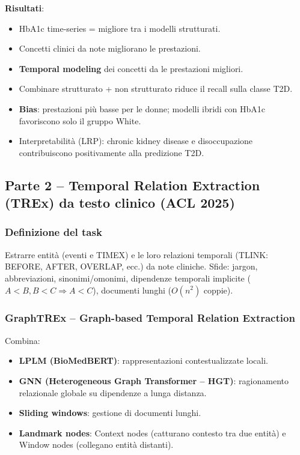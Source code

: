 \documentclass[a4paper,12pt]{article}
\begin{document}
\textbf{Risultati}:
\begin{itemize}
    \item HbA1c time-series = migliore tra i modelli strutturati.
    \item Concetti clinici da note migliorano le prestazioni.
    \item \textbf{Temporal modeling} dei concetti da le prestazioni migliori.
    \item Combinare strutturato + non strutturato riduce il recall sulla classe T2D.
    \item \textbf{Bias}: prestazioni pi\`u basse per le donne; modelli ibridi con HbA1c favoriscono solo il gruppo White.
    \item Interpretabilit\`a (LRP): chronic kidney disease e disoccupazione contribuiscono positivamente alla predizione T2D.
\end{itemize}

\subsection{Parte 2 -- Temporal Relation Extraction (TREx) da testo clinico (ACL 2025)}

\subsubsection{Definizione del task}
Estrarre entit\`a (eventi e TIMEX) e le loro relazioni temporali (TLINK: BEFORE, AFTER, OVERLAP, ecc.) da note cliniche. Sfide: jargon, abbreviazioni, sinonimi/omonimi, dipendenze temporali implicite ($A < B, B < C \Rightarrow A < C$), documenti lunghi ($O(n^2)$ coppie).

\subsubsection{GraphTREx -- Graph-based Temporal Relation Extraction}
Combina:
\begin{itemize}
    \item \textbf{LPLM (BioMedBERT)}: rappresentazioni contestualizzate locali.
    \item \textbf{GNN (Heterogeneous Graph Transformer -- HGT)}: ragionamento relazionale globale su dipendenze a lunga distanza.
    \item \textbf{Sliding windows}: gestione di documenti lunghi.
    \item \textbf{Landmark nodes}: Context nodes (catturano contesto tra due entit\`a) e Window nodes (collegano entit\`a distanti).
\end{itemize}
\end{document}
